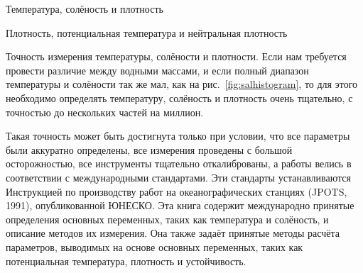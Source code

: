 \begin{chapter}{Температура, солёность и плотность}
\begin{section}{Плотность, потенциальная температура и нейтральная плотность}
\begin{paragraph}{Точность измерения температуры, солёности и плотности.}
Если нам требуется провести различие между водными массами, и если полный
диапазон температуры и солёности так же мал, как на рис.~\ref{fig:salhistogram}, 
то для этого необходимо определять температуру, солёность и плотность очень 
тщательно, с точностью до нескольких частей на миллион.
%

Такая точность может быть достигнута только при условии, что все параметры
были аккуратно определены, все измерения проведены с большой
осторожностью, все инструменты тщательно откалиброваны, а работы велись 
в соответствии с международными стандартами. Эти стандарты устанавливаются
Инструкцией по производству работ на океанографических станциях (JPOTS, 1991),
опубликованной ЮНЕСКО. Эта книга содержит международно принятые
определения основных переменных, таких как температура и солёность, и
описание методов их измерения. Она также задаёт принятые методы
расчёта параметров, выводимых на основе основных переменных, таких как
потенциальная температура, плотность и устойчивость.
%
\end{paragraph}
\end{section}


\end{chapter}
